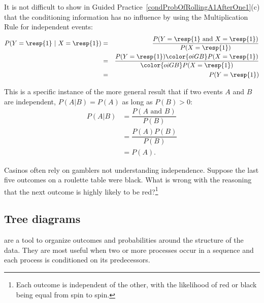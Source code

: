 It is not difficult to show in Guided Practice~\ref{condProbOfRollingA1AfterOne1}(c) that the conditioning information has no influence by using the Multiplication Rule for independent events:
\begin{eqnarray*}
P(Y=\text{\resp{1}}\ |\ X=\text{\resp{1}})
	&=& \frac{P(Y=\text{\resp{1} and }X=\text{\resp{1}})}{P(X=\text{\resp{1}})} \\
	&=& \frac{P(Y=\text{\resp{1}}) \color{oiGB}P(X=\text{\resp{1}})}{\color{oiGB}P(X=\text{\resp{1}})} \\
	&=& P(Y=\text{\resp{1}}) \\
\end{eqnarray*}

This is a specific instance of the more general result that if two events $A$ and $B$ are independent, $P(A |B) = P(A)$ as long as $P(B) > 0$:
\begin{eqnarray*}
	P(A | B) &= \dfrac{P(A \text{ and } B)}{P(B)} \\
	     &= \dfrac{P(A) P(B)}{P(B)} \\
		 &= P(A).
\end{eqnarray*} 

\begin{exercise}
Casinos often rely on gamblers not understanding independence.  Suppose the last five outcomes on a roulette table were black.  What is wrong with the reasoning that the next outcome is highly likely to be red?\footnote{Each outcome is independent of the other, with the likelihood of red or black being equal from spin to spin.}
\end{exercise}




\subsection{Tree diagrams}


 are a tool to organize outcomes and probabilities around the structure of the data. They are most useful when two or more processes occur in a sequence and each process is conditioned on its predecessors.

